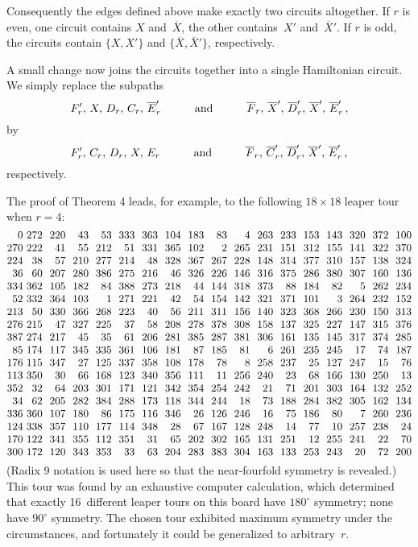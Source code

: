 Consequently the edges defined above make exactly two circuits altogether.
If $r$ is even, one circuit contains $X$ and~$\overline{X}$, the other
contains~$X'$ and~$\overline{X}'$. If $r$ is odd, the circuits contain
$\{X,X'\}$ and $\{\overline{X},\overline{X}'\}$, respectively.

A small change now joins the circuits together into a single Hamiltonian
circuit. We simply replace the subpaths
$$F'_r,\,X,\,D_r,\,C_r,\,\overline E'_r\qquad\quad{\rm and}\quad\qquad
\overline F_r,\,\overline{X}',\,\overline D'_r,\,\overline{X}',\,\overline E'_r\,,$$
by
$$F'_r,\,C_r,\,D_r,\,X,\,E_r\qquad\quad{\rm and}\qquad\quad
\overline F_r,\,\overline C'_r,\,\overline D'_r,\,\overline X',\,\overline E'_r\,,$$
respectively. \ \pfbox

\medskip
The proof of Theorem 4 leads, for example, to the following $18\times
18$ leaper tour when $r=4$:
$$\vcenter{\halign{%
$\hfil#$\ %
&$\hfil#$\ \ &$\hfil#$\ \ &$\hfil#$\ \ &$\hfil#$\ \ &$\hfil#$\ \ %
&$\hfil#$\ \ &$\hfil#$\ \ &$\hfil#$\ \ &$\hfil#$\ \ &$\hfil#$\ \ %
&$\hfil#$\ \ &$\hfil#$\ \ &$\hfil#$\ \ &$\hfil#$\ \ &$\hfil#$\ \ %
&$\hfil#$\ \ &$\hfil#$\cr
0&272&220&43&53&333&363&104&183&83&4&263&233&153&143&320&372&100\cr
270&222&41&55&212&51&331&365&102&2&265&231&151&312&155&141&322&370\cr
224&38&57&210&277&214&48&328&367&267&228&148&314&377&310&157&138&324\cr
36&60&207&280&386&275&216&46&326&226&146&316&375&286&380&307&160&136\cr
334&362&105&182&84&388&273&218&44&144&318&373&88&184&82&5&262&234\cr
52&332&364&103&1&271&221&42&54&154&142&321&371&101&3&264&232&152\cr
213&50&330&366&268&223&40&56&211&311&156&140&323&368&266&230&150&313\cr
276&215&47&327&225&37&58&208&278&378&308&158&137&325&227&147&315&376\cr
387&274&217&45&35&61&206&281&385&287&381&306&161&135&145&317&374&285\cr
85&174&117&345&335&361&106&181&87&185&81&6&261&235&245&17&74&187\cr
176&115&347&27&125&337&358&108&178&78&8&258&237&25&127&247&15&76\cr
113&350&30&66&168&123&340&356&111&11&256&240&23&68&166&130&250&13\cr
352&32&64&203&301&171&121&342&354&254&242&21&71&201&303&164&132&252\cr
34&62&205&282&384&288&173&118&344&244&18&73&188&284&382&305&162&134\cr
336&360&107&180&86&175&116&346&26&126&246&16&75&186&80&7&260&236\cr
124&338&357&110&177&114&348&28&67&167&128&248&14&77&10&257&238&24\cr
170&122&341&355&112&351&31&65&202&302&165&131&251&12&255&241&22&70\cr
300&172&120&343&353&33&63&204&283&383&304&163&133&253&243&20&72&200\cr
}}$$
(Radix 9 notation is used here so that the near-fourfold symmetry is revealed.)
This tour was found by an exhaustive computer calculation, which determined
that exactly 16~different leaper tours on this board have $180^{\circ}$
symmetry; none have $90^{\circ}$ symmetry. The chosen tour exhibited maximum
symmetry under the circumstances, and fortunately it could be generalized to
arbitrary~$r$. 

